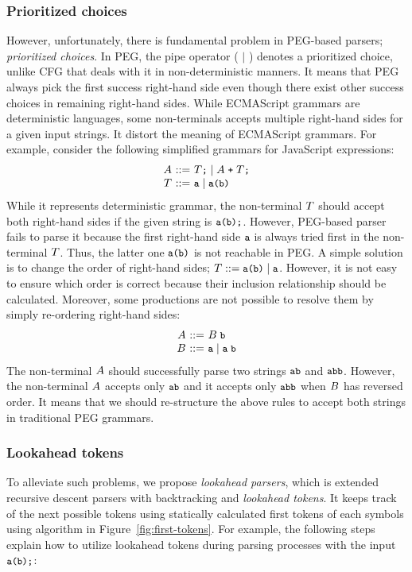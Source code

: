 \subsubsection{Prioritized choices}
However, unfortunately, there is fundamental problem in PEG-based parsers;
\textit{prioritized choices}.
In PEG, the pipe operator ( \( \mid \) ) denotes a prioritized choice,
unlike CFG that deals with it in non-deterministic manners.
It means that PEG always pick the first success right-hand side even though
there exist other success choices in remaining right-hand sides.
While ECMAScript grammars are deterministic languages, some non-terminals
accepts multiple right-hand sides for a given input strings.
It distort the meaning of ECMAScript grammars.
For example, consider the following simplified grammars for JavaScript expressions:
\[
  \begin{array}{r@{~}c@{~}l}
    \NT{A} &::=& \NT{T} \T{;} \mid \NT{A} \; \T{+} \; \NT{T} \T{;} \\
    \NT{T} &::=& \T{a} \mid \T{a} \T{(} \T{b} \T{)}\\
  \end{array}
\]
While it represents deterministic grammar, the non-terminal \( T \)
should accept both right-hand sides if the given string is \( \texttt{\small a(b);} \).
However, PEG-based parser fails to parse it
because the first right-hand side \( \texttt{\small a} \) is always tried
first in the non-terminal \( T \).
Thus, the latter one \( \texttt{\small a} \texttt{\small(} \texttt{\small b} \texttt{\small)} \) is not reachable in PEG.
A simple solution is to change the order of right-hand sides;
\( T ::= \texttt{\small a} \texttt{\small(} \texttt{\small b} \texttt{\small)} \mid \texttt{\small a} \).
However, it is not easy to ensure which order is correct
because their inclusion relationship should be calculated.
Moreover, some productions are not possible to resolve them
by simply re-ordering right-hand sides:
\[
  \begin{array}{r@{~}c@{~}l}
    \NT{A} &::=& \NT{B} \; \T{b}\\
    \NT{B} &::=& \T{a} \mid \T{a} \; \T{b}\\
  \end{array}
\]
The non-terminal \( A \) should successfully parse two strings \( \texttt{\small ab} \)
and \( \texttt{\small abb} \). However, the non-terminal \( A \) accepts only
\( \texttt{\small ab} \) and it accepts only \( \texttt{\small abb} \) when \( B \) has
reversed order. It means that we should re-structure
the above rules to accept both strings in traditional PEG grammars.

\subsubsection{Lookahead tokens}
To alleviate such problems, we propose \textit{lookahead parsers},
which is extended recursive descent parsers with backtracking and
\textit{lookahead tokens}.
It keeps track of the next possible tokens using statically
calculated first tokens of each symbols using algorithm in
Figure~\ref{fig:first-tokens}. For example, the following steps explain
how to utilize lookahead tokens during parsing processes with
the input \( \texttt{\small a(b);} \):

